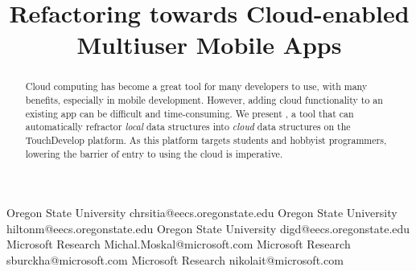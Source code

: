\documentclass{sigplanconf}
\begin{document}
\setlength{\pdfpageheight}{\paperheight}
\setlength{\pdfpagewidth}{\paperwidth}






\title{Refactoring towards Cloud-enabled Multiuser Mobile Apps}

           {Oregon State University}
           {chrsitia@eecs.oregonstate.edu}
           {Oregon State University}
           {hiltonm@eecs.oregonstate.edu}
           {Oregon State University}
           {digd@eecs.oregonstate.edu}
           {Microsoft Research}
           {Michal.Moskal@microsoft.com}
           {Microsoft Research}
           {sburckha@microsoft.com}
           {Microsoft Research}
           {nikolait@microsoft.com}
\maketitle


\begin{abstract}
Cloud computing has become a great tool for many developers to use, with many benefits, especially in mobile development.  However, adding cloud functionality to an existing app can be difficult and time-consuming. We present \tool, a tool that can automatically refractor \emph{local} data structures into \emph{cloud} data structures on the TouchDevelop platform.  As this platform targets students and hobbyist programmers, lowering the barrier of entry to using the cloud is imperative.
\end{abstract}
\end{document}
